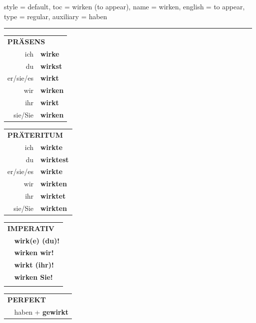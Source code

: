 \begin{verbentry}{
  style = {default},
  toc = {wirken (to appear)},
  name = {wirken},
  english = {to appear},
  type = {regular},
  auxiliary = {haben}
}
 
    
     \vspace{5pt}

    \hrule
    
    \vspace{5pt}

  \begin{tabular}{rl}
     \multicolumn{2}{l}{\textbf{PRÄSENS} }\\
    ich & \textbf{wirke}\\
    du & \textbf{wirkst}\\
    er/sie/es & \textbf{wirkt}\\
    wir & \textbf{wirken}\\
    ihr & \textbf{wirkt}\\
    sie/Sie & \textbf{wirken}\\
  \end{tabular}
  \hfill
     \begin{tabular}{rl}
    \multicolumn{2}{l}{\textbf{PRÄTERITUM} }\\
    ich & \textbf{wirkte}\\
    du & \textbf{wirktest}\\
    er/sie/es & \textbf{wirkte}\\
    wir & \textbf{wirkten}\\
    ihr & \textbf{wirktet}\\
    sie/Sie & \textbf{wirkten}\\
  \end{tabular}
  \hfill
  \begin{tabular}{rl}
     \multicolumn{2}{l}{\textbf{IMPERATIV} }\\
   & \textbf{wirk(e) (du)!}\\
   & \textbf{wirken wir!}\\
   & \textbf{wirkt (ihr)!}\\
   & \textbf{wirken Sie!}\\
   & \vspace{10pt}
  \end{tabular}

    \vspace{10pt}

 \begin{tabular}{rl}
     \multicolumn{2}{l}{\textbf{PERFEKT}}\\
  &  haben + \textbf{gewirkt}\\
  \end{tabular}
\hfill
   \begin{tabular}{rl}
   

\end{tabular}
\end{verbentry}
